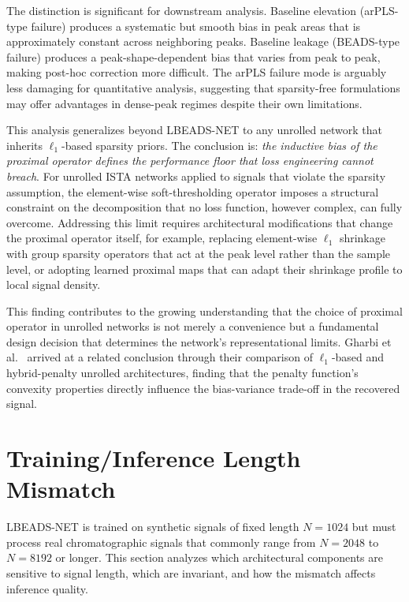 The distinction is significant for downstream analysis. Baseline elevation (arPLS-type failure) produces a systematic but smooth bias in peak areas that is approximately constant across neighboring peaks. Baseline leakage (BEADS-type failure) produces a peak-shape-dependent bias that varies from peak to peak, making post-hoc correction more difficult. The arPLS failure mode is arguably less damaging for quantitative analysis, suggesting that sparsity-free formulations may offer advantages in dense-peak regimes despite their own limitations.

This analysis generalizes beyond LBEADS-NET to any unrolled network that inherits $\ell_1$-based sparsity priors. The conclusion is: \emph{the inductive bias of the proximal operator defines the performance floor that loss engineering cannot breach}. For unrolled ISTA networks applied to signals that violate the sparsity assumption, the element-wise soft-thresholding operator imposes a structural constraint on the decomposition that no loss function, however complex, can fully overcome. Addressing this limit requires architectural modifications that change the proximal operator itself, for example, replacing element-wise $\ell_1$ shrinkage with group sparsity operators that act at the peak level rather than the sample level, or adopting learned proximal maps that can adapt their shrinkage profile to local signal density.

This finding contributes to the growing understanding that the choice of proximal operator in unrolled networks is not merely a convenience but a fundamental design decision that determines the network's representational limits. Gharbi et al.~\cite{gharbi2024unrolled} arrived at a related conclusion through their comparison of $\ell_1$-based and hybrid-penalty unrolled architectures, finding that the penalty function's convexity properties directly influence the bias-variance trade-off in the recovered signal.


\section{Training/Inference Length Mismatch}
\label{sec:disc_length}

LBEADS-NET is trained on synthetic signals of fixed length $N = 1024$ but must process real chromatographic signals that commonly range from $N = 2048$ to $N = 8192$ or longer. This section analyzes which architectural components are sensitive to signal length, which are invariant, and how the mismatch affects inference quality.

